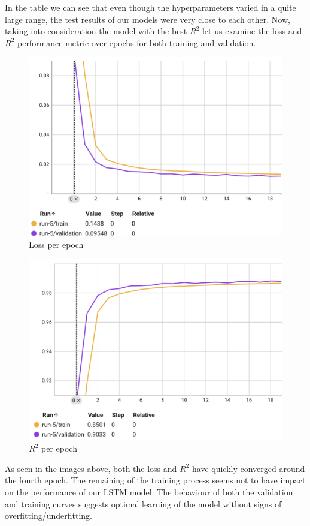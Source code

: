 In the table we can see that even though the hyperparameters varied in a quite large range, the test results of our models were very close to each other. Now, taking into consideration the model with the best \(R^2\) let us examine the loss and \(R^2\) performance metric over epochs for both training and validation.

\begin{figure}[H]
    \centering
    \includegraphics[width=0.75\linewidth]{images/lstm_loss_epoch.png}
    \caption{Loss per epoch}
    \label{fig:lstm_loss_epoch}
\end{figure}
\begin{figure}[H]
    \centering
    \includegraphics[width=0.75\linewidth]{images/lstm_r2_epoch.png}
    \caption{\(R^2\) per epoch}
    \label{fig:lstm_r2_epoch}
\end{figure}

As seen in the images above, both the loss and \(R^2\) have quickly converged around the fourth epoch. The remaining of the training process seems not to have impact on the performance of our LSTM model. The behaviour of both the validation and training curves suggests optimal learning of the model without signs of overfitting/underfitting.
